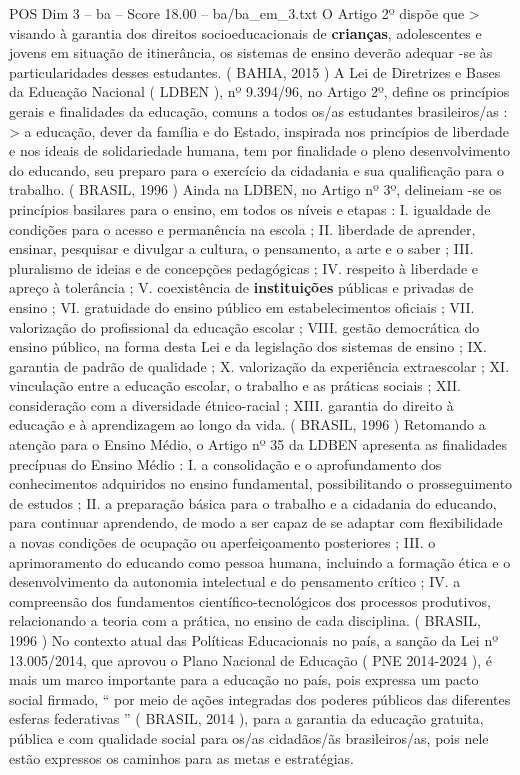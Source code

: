 \begin{textsample}{POS Dim 3 – ba – Score 18.00 – ba/ba\_em\_3.txt}
O Artigo 2º dispõe que > visando à garantia dos direitos socioeducacionais de \textbf{crianças}, adolescentes e jovens em situação de itinerância, os sistemas de ensino deverão adequar -se às particularidades desses estudantes. ( BAHIA, 2015 ) A Lei de Diretrizes e Bases da Educação Nacional ( LDBEN ), nº 9.394/96, no Artigo 2º, define os princípios gerais e finalidades da educação, comuns a todos os/as estudantes brasileiros/as : > a educação, dever da família e do Estado, inspirada nos princípios de liberdade e nos ideais de solidariedade humana, tem por finalidade o pleno desenvolvimento do educando, seu preparo para o exercício da cidadania e sua qualificação para o trabalho. ( BRASIL, 1996 ) Ainda na LDBEN, no Artigo nº 3º, delineiam -se os princípios basilares para o ensino, em todos os níveis e etapas : I. igualdade de condições para o acesso e permanência na escola ; II. liberdade de aprender, ensinar, pesquisar e divulgar a cultura, o pensamento, a arte e o saber ; III. pluralismo de ideias e de concepções pedagógicas ; IV. respeito à liberdade e apreço à tolerância ; V. coexistência de \textbf{instituições} públicas e privadas de ensino ; VI. gratuidade do ensino público em estabelecimentos oficiais ; VII. valorização do profissional da educação escolar ; VIII. gestão democrática do ensino público, na forma desta Lei e da legislação dos sistemas de ensino ; IX. garantia de padrão de qualidade ; X. valorização da experiência extraescolar ; XI. vinculação entre a educação escolar, o trabalho e as práticas sociais ; XII. consideração com a diversidade étnico-racial ; XIII. garantia do direito à educação e à aprendizagem ao longo da vida. ( BRASIL, 1996 ) Retomando a atenção para o Ensino Médio, o Artigo nº 35 da LDBEN apresenta as finalidades precípuas do Ensino Médio : I. a consolidação e o aprofundamento dos conhecimentos adquiridos no ensino fundamental, possibilitando o prosseguimento de estudos ; II. a preparação básica para o trabalho e a cidadania do educando, para continuar aprendendo, de modo a ser capaz de se adaptar com flexibilidade a novas condições de ocupação ou aperfeiçoamento posteriores ; III. o aprimoramento do educando como pessoa humana, incluindo a formação ética e o desenvolvimento da autonomia intelectual e do pensamento crítico ; IV. a compreensão dos fundamentos científico-tecnológicos dos processos produtivos, relacionando a teoria com a prática, no ensino de cada disciplina. ( BRASIL, 1996 ) No contexto atual das Políticas Educacionais no país, a sanção da Lei nº 13.005/2014, que aprovou o Plano Nacional de Educação ( PNE 2014-2024 ), é mais um marco importante para a educação no país, pois expressa um pacto social firmado, “ por meio de ações integradas dos poderes públicos das diferentes esferas federativas ” ( BRASIL, 2014 ), para a garantia da educação gratuita, pública e com qualidade social para os/as cidadãos/ãs brasileiros/as, pois nele estão expressos os caminhos para as metas e estratégias.

\end{textsample}

